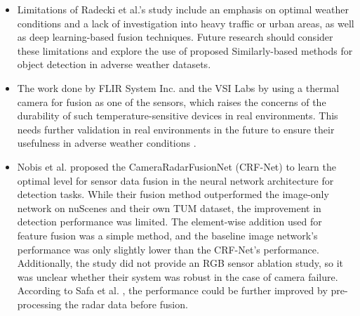 \documentclass[rnd]{mas_proposal}
\begin{document}
\begin{itemize}

    
      \item Limitations of Radecki et al.'s \cite{radecki2016all} study include an emphasis on optimal weather conditions and a lack of investigation into heavy traffic or urban areas, as well as deep learning-based fusion techniques. Future research should consider these limitations and explore the use of proposed Similarly-based methods for object detection in adverse weather datasets. 

      \item The work done by FLIR System Inc. \cite{fused_aeb} and the VSI Labs \cite{VSILabs} by using a thermal camera for fusion as one of the sensors, which raises the concerns of the durability of such temperature-sensitive devices in real environments. This needs further validation in real environments in the future to ensure their usefulness in adverse weather conditions \cite{zang2019impact}.
      \item Nobis et al. \cite{nobis2019deep} proposed the CameraRadarFusionNet (CRF-Net) to learn the optimal level for sensor data fusion in the neural network architecture for detection tasks. While their fusion method outperformed the image-only network on nuScenes \cite{caesar2020nuscenes} and their own TUM dataset, the improvement in detection performance was limited. The element-wise addition used for feature fusion was a simple method, and the baseline image network's performance was only slightly lower than the CRF-Net's performance. Additionally, the study did not provide an RGB sensor ablation study, so it was unclear whether their system was robust in the case of camera failure. According to Safa et al. \cite{safa2021fail}, the performance could be further improved by pre-processing the radar data before fusion.
      

\end{itemize}
\end{document}
